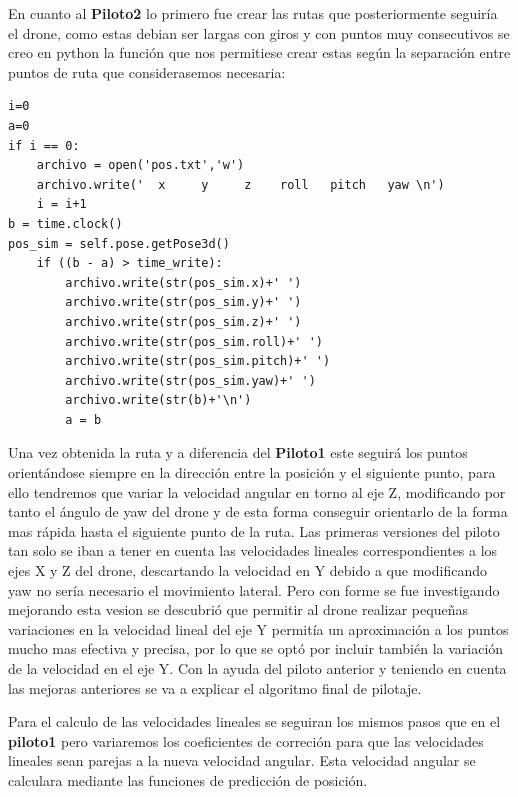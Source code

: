 \hspace{1cm} En cuanto al \textbf{Piloto2} lo primero fue crear las rutas que posteriormente seguiría el drone, como estas debian ser largas con giros y con puntos muy consecutivos se creo en python la función que nos permitiese crear estas según la separación entre puntos de ruta que considerasemos necesaria: 
\begin{lstlisting}[backgroundcolor=\color{gray!15}]
i=0
a=0
if i == 0:
    archivo = open('pos.txt','w')
    archivo.write('  x     y     z    roll   pitch   yaw \n')
    i = i+1
b = time.clock()
pos_sim = self.pose.getPose3d()
    if ((b - a) > time_write):
        archivo.write(str(pos_sim.x)+' ')
        archivo.write(str(pos_sim.y)+' ')
        archivo.write(str(pos_sim.z)+' ')
        archivo.write(str(pos_sim.roll)+' ')
        archivo.write(str(pos_sim.pitch)+' ')
        archivo.write(str(pos_sim.yaw)+' ')
        archivo.write(str(b)+'\n')
        a = b 
\end{lstlisting}

\hspace{1cm} Una vez obtenida la ruta y a diferencia del \textbf{Piloto1} este seguirá los puntos orientándose siempre en la dirección entre la posición y el siguiente punto, para ello tendremos que variar la velocidad angular en torno al eje Z, modificando por tanto el ángulo de yaw del drone y de esta forma conseguir orientarlo de la forma mas rápida hasta el siguiente punto de la ruta. Las primeras versiones del piloto tan solo se iban a tener en cuenta las velocidades lineales correspondientes a los ejes X y Z del drone, descartando la velocidad en Y debido a que modificando yaw no sería necesario el movimiento lateral. Pero con forme se fue investigando  mejorando esta vesion se descubrió que permitir al drone realizar pequeñas variaciones en la velocidad lineal del eje Y permitía un aproximación a los puntos mucho mas efectiva y precisa, por lo que se optó por incluir también la variación de la velocidad en el eje Y. Con la ayuda del piloto anterior y teniendo en cuenta las mejoras anteriores se va a explicar el algoritmo final de pilotaje. 

\hspace{1cm} Para el calculo de las velocidades lineales se seguiran los mismos pasos que en el \textbf{piloto1} pero variaremos los coeficientes de correción para que las velocidades lineales sean parejas a la nueva velocidad angular. Esta velocidad angular se calculara mediante las funciones de predicción de posición. 


